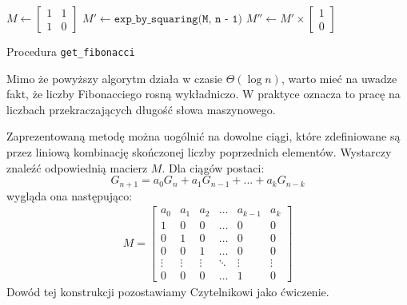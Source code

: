 \begin{algorithm}[h]
  \DontPrintSemicolon



  $M \leftarrow \begin{bmatrix}
                  1 & 1 \\
                  1 & 0
                \end{bmatrix}$\;
  $M' \leftarrow \texttt{exp\_by\_squaring(M, n - 1)}$\;
  $M'' \leftarrow M' \times \begin{bmatrix}1 \\ 0\end{bmatrix}$\;
  \;

  \caption{Procedura \texttt{get\_fibonacci}}
\end{algorithm}
Mimo że powyższy algorytm działa w czasie $\Theta(\log{n})$, warto mieć na uwadze fakt, że liczby Fibonacciego 
rosną wykładniczo. W praktyce oznacza to pracę na liczbach przekraczających długość słowa maszynowego.

Zaprezentowaną metodę można uogólnić na dowolne ciągi, które zdefiniowane są przez liniową 
kombinację skończonej liczby poprzednich elementów. Wystarczy znaleźć odpowiednią macierz $M$. 
Dla ciągów postaci:
\begin{equation*}
  G_{n + 1} = a_0 G_n + a_1 G_{n - 1} + ... + a_k G_{n - k}
\end{equation*}
wygląda ona następująco:
\begin{align*}
  M
  =
  \begin{bmatrix}
    a_0    & a_1       & a_2       & \dots  & a_{k - 1}     & a_k \\
    1      & 0         & 0         & \dots  & 0             & 0 \\
    0      & 1         & 0         & \dots  & 0             & 0 \\
    0      & 0         & 1         & \dots  & 0             & 0 \\
    \vdots & \vdots    & \vdots    & \ddots & \vdots        & \vdots \\
    0      & 0         & 0         & \dots  & 1             & 0
  \end{bmatrix}
\end{align*}
Dowód tej konstrukcji pozostawiamy Czytelnikowi jako ćwiczenie.
